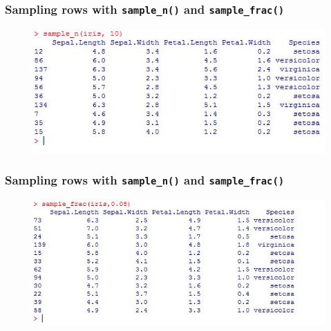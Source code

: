 \documentclass{beamer}
\begin{document}
	\begin{frame}
		\frametitle{Sampling rows with \texttt{sample\_n()} and \texttt{sample\_frac()}}
		\Large
		
		\begin{figure}
			\centering
			\includegraphics[width=1.07\linewidth]{images/irissample1}
		\end{figure}
		
	\end{frame}
	\begin{frame}
		\frametitle{Sampling rows with \texttt{sample\_n()} and \texttt{sample\_frac()}}
		
		\begin{figure}
			\centering
			\includegraphics[width=1.07\linewidth]{images/irissample2}
		\end{figure}
		
	\end{frame}
\end{document}
